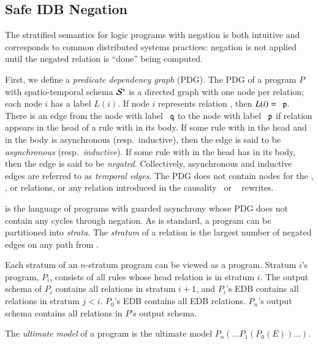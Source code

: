 \subsection{Safe IDB Negation}
\label{sec:perfect-construction}

The stratified semantics for logic programs with negation is both intuitive and corresponds to common
distributed systems practices: negation is not applied until the negated
relation is ``done'' being computed.

First, we define a {\em predicate dependency graph} (PDG).  The PDG of a \lang program $P$ with spatio-temporal schema $\stschema$ is a directed graph with one node per relation; each node $i$ has a label $L(i)$.  If node $i$ represents relation , then $L(i) = \dedalus{p}$.  There is an edge from the node with label $\dedalus{q}$ to the node with label $\dedalus{p}$ if relation  appears in the head of a rule with  in its body.  If some rule with  in the head and  in the body is asynchronous (resp.\ inductive), then the edge is said to be {\em asynchronous} (resp.\ {\em inductive}).  If some rule with  in the head has  in its body, then the edge is said to be {\em negated}.  Collectively, asynchronous and inductive edges are referred to as {\em temporal edges}.  The PDG does not contain nodes for the , , or  relations, or any relation introduced in the causality~\cite{ameloot-operational} or ~\cite{sacca-zaniolo} rewrites.

\plang is the language of \lang programs with guarded asynchrony whose PDG does not contain any cycles through negation.  As is standard, a \plang program can be partitioned into {\em strata}.  The {\em stratum} of a relation  is the largest number of negated edges on any path from .

Each stratum of an $n$-stratum \plang program can be viewed as a \slang program.  Stratum $i$'s program, $P_i$, consists of all rules whose head relation is in stratum $i$.  The output schema of $P_i$ contains all relations in stratum $i+1$, and $P_i$'s EDB contains all relations in stratum $j < i$.  $P_0$'s EDB contains all EDB relations.  $P_n$'s output schema contains all relations in $P$'s output schema.

The {\em ultimate model} of a \plang program is the ultimate model $P_n(\ldots P_1(P_0(E)) \ldots )$.



